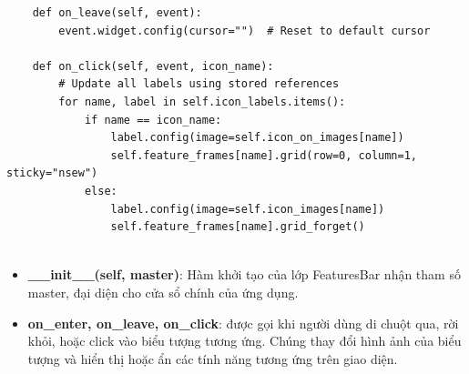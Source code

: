 \documentclass[a4paper]{article}
\begin{document}
\begin{mdframed}[hidealllines=true,backgroundcolor=magenta!10]
\begin{lstlisting}
    def on_leave(self, event):
        event.widget.config(cursor="")  # Reset to default cursor

    def on_click(self, event, icon_name):
        # Update all labels using stored references
        for name, label in self.icon_labels.items():
            if name == icon_name:
                label.config(image=self.icon_on_images[name])
                self.feature_frames[name].grid(row=0, column=1, sticky="nsew")
            else:
                label.config(image=self.icon_images[name])
                self.feature_frames[name].grid_forget()


\end{lstlisting}
\end{mdframed}

\begin{itemize}
    \item \textbf{\_\_init\_\_(self, master)}: Hàm khởi tạo của lớp FeaturesBar nhận tham số master, đại diện cho cửa sổ chính của ứng dụng. 
    \item \textbf{on\_enter, on\_leave, on\_click}: được gọi khi người dùng di chuột qua, rời khỏi, hoặc click vào biểu tượng tương ứng. Chúng thay đổi hình ảnh của biểu tượng và hiển thị hoặc ẩn các tính năng tương ứng trên giao diện. 
\end{itemize}
\end{document}
